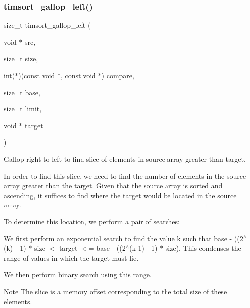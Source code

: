 \subsubsection{\texorpdfstring{timsort\+\_\+gallop\+\_\+left()}{timsort\_gallop\_left()}}
{\footnotesize\ttfamily size\+\_\+t timsort\+\_\+gallop\+\_\+left (\begin{DoxyParamCaption}\item[{void $\ast$}]{src,  }\item[{size\+\_\+t}]{size,  }\item[{int($\ast$)(const void $\ast$, const void $\ast$)}]{compare,  }\item[{size\+\_\+t}]{base,  }\item[{size\+\_\+t}]{limit,  }\item[{void $\ast$}]{target }\end{DoxyParamCaption})}



Gallop right to left to find slice of elements in source array greater than target. 

In order to find this slice, we need to find the number of elements in the source array greater than the target. Given that the source array is sorted and ascending, it suffices to find where the target would be located in the source array.

To determine this location, we perform a pair of searches\+:
\begin{DoxyEnumerate}
\item We first perform an exponential search to find the value k such that base -\/ ((2$^\wedge$(k) -\/ 1) $\ast$ size $<$ target $<$= base -\/ ((2$^\wedge$(k-\/1) -\/ 1) $\ast$ size). This condenses the range of values in which the target must lie.
\item We then perform binary search using this range.
\end{DoxyEnumerate}

\begin{DoxyNote}{Note}
The slice is a memory offset corresponding to the total size of these elements.
\end{DoxyNote}


